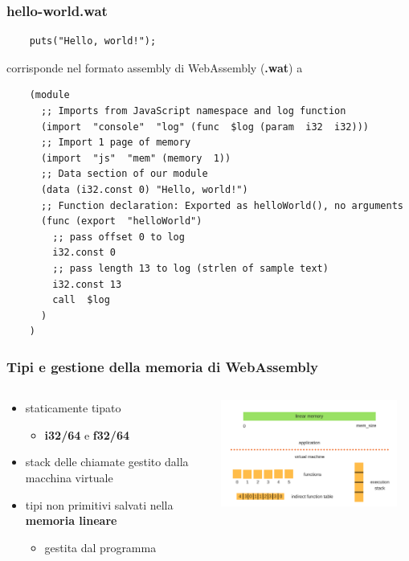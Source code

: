 \documentclass{beamer}
\newcommand\Fontvi{\fontsize{9.5}{7.2}\selectfont}
\begin{document}
\begin{frame}[fragile]
  \frametitle{hello-world.wat}
  \Fontvi
  \begin{verbatim}
    puts("Hello, world!");
  \end{verbatim}

  \vspace{0.2in}
  \centerline{corrisponde nel formato assembly di WebAssembly  (\textbf{.wat}) a}
  \vspace{0.2in}

  \pause

  \begin{verbatim}
    (module
      ;; Imports from JavaScript namespace and log function
      (import  "console"  "log" (func  $log (param  i32  i32)))
      ;; Import 1 page of memory
      (import  "js"  "mem" (memory  1))
      ;; Data section of our module
      (data (i32.const 0) "Hello, world!")
      ;; Function declaration: Exported as helloWorld(), no arguments
      (func (export  "helloWorld")
        ;; pass offset 0 to log
        i32.const 0
        ;; pass length 13 to log (strlen of sample text)
        i32.const 13          
        call  $log
      )
    ) 
  \end{verbatim}
\end{frame}

\begin{frame}
  \frametitle{Tipi e gestione della memoria di WebAssembly}
  \begin{columns}
    \begin{column}{0.6\textwidth}
  \begin{itemize}
    \item staticamente tipato
      \begin{itemize}
        \item \textbf{i32/64} e \textbf{f32/64}
      \end{itemize}
    \pause
    \item stack delle chiamate gestito dalla macchina virtuale
    \pause
    \item tipi non primitivi salvati \newline nella \textbf{memoria lineare}
    \begin{itemize}
      \item gestita dal programma
    \end{itemize}
  \end{itemize} 
  \end{column}
  \begin{column}{0.4\textwidth}
  \centerline{\includegraphics[width=10cm,height=3.5cm,keepaspectratio]{images/linmem.png}}
    \end{column}
  \end{columns}
\end{frame}
\end{document}
